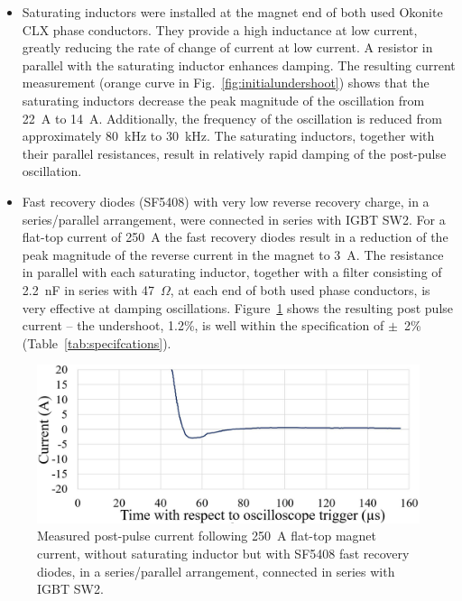 \documentclass[aps,prab,twocolumn,superscriptaddress]{revtex4-1}
\begin{document}
\begin{itemize}[leftmargin=*]
	\item Saturating inductors were installed at the magnet end of both used Okonite CLX phase conductors. They provide a high inductance at low current, greatly reducing the rate of change of current at low current. A resistor in parallel with the saturating inductor enhances damping. The resulting current measurement (orange curve in Fig.~\ref{fig:initialundershoot}) shows that the saturating inductors decrease the peak  magnitude of the oscillation from 22~A to 14~A. Additionally, the frequency of the oscillation is reduced from approximately 80~kHz to 30~kHz. The saturating inductors, together with their parallel resistances, result in relatively rapid damping of the post-pulse oscillation.
	\item Fast recovery diodes (SF5408) with very low reverse recovery charge, in a series/parallel arrangement, were connected in series with IGBT SW2. For a flat-top current of 250~A the fast recovery diodes result in a reduction of the peak magnitude of the reverse current in the magnet to 3~A. The resistance in parallel with each saturating inductor, together with a filter consisting of 2.2~nF in series with 47~$\Omega$, at each end of both used phase conductors, is very effective at damping oscillations. Figure~\ref{fig:finalundershoot} shows the resulting post pulse current -- the undershoot, 1.2\%, is well within the specification of $\pm$~2\% (Table~\ref{tab:specifcations}).  
\end{itemize}
\begin{figure}[h]
	\includegraphics[width=\linewidth]{final-undershoot-smaller.png} %
	\caption{Measured post-pulse current following 250~A flat-top magnet current, without saturating inductor but with SF5408 fast recovery diodes, in a series/parallel arrangement, connected in series with IGBT SW2.}
	\label{fig:finalundershoot}
\end{figure}
\end{document}
